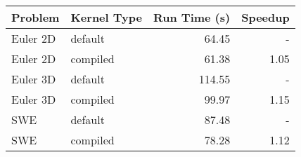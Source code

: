 \begin{tabular}{llrr}
\toprule
Problem & Kernel Type & Run Time (s) & Speedup \\
\midrule
 Euler 2D & default & 64.45 & - \\
 Euler 2D & compiled & 61.38 & 1.05 \\
 Euler 3D & default & 114.55 & - \\
 Euler 3D & compiled & 99.97 & 1.15 \\
 SWE & default & 87.48 & - \\
 SWE & compiled & 78.28 & 1.12 \\
\bottomrule
\end{tabular}
